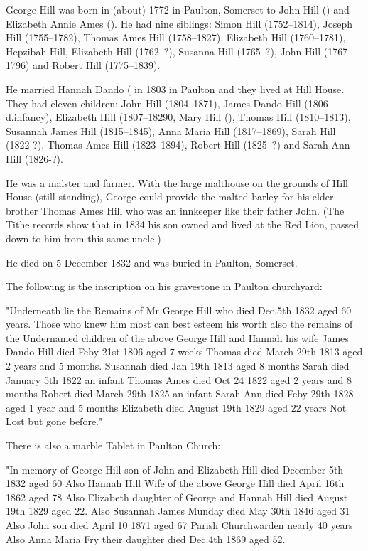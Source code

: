 
George Hill was born in (about) 1772 in	Paulton, Somerset to John Hill () and Elizabeth Annie Ames ().  He had nine siblings: Simon Hill (1752--1814), Joseph Hill (1755--1782), Thomas Ames Hill (1758--1827), Elizabeth Hill (1760--1781), Hepzibah Hill, Elizabeth Hill (1762--?), Susanna Hill (1765--?),
John Hill (1767--1796) and Robert Hill (1775--1839). 

He married Hannah Dando ( in 1803 in Paulton and they lived at Hill House. They had eleven children: 
John Hill (1804--1871), James Dando Hill (1806-d.infancy), Elizabeth Hill (1807--18290, Mary Hill (),
Thomas Hill (1810--1813), Susannah James Hill (1815--1845), Anna Maria Hill (1817--1869), Sarah Hill (1822-?),
Thomas Ames Hill (1823--1894), Robert Hill (1825--?) and Sarah Ann Hill (1826-?). 
    
He was a malster and farmer. With the large malthouse on the grounds of Hill House (still standing), George could provide the malted barley for his elder brother Thomas Ames Hill who was an innkeeper like their father John. (The Tithe records show that in 1834 his son owned and lived at the Red Lion, passed down to him from this same uncle.) 

He died on 5 December 1832 and was buried in Paulton, Somerset.

The following is the inscription on his gravestone in Paulton churchyard:

"Underneath lie the Remains of Mr George Hill who died Dec.5th 1832 aged 60 years.
Those who knew him most can best esteem his worth also the remains of the Undernamed children of the above
George Hill and Hannah his wife
James Dando Hill died Feby 21st 1806 aged 7 weeks
Thomas died March 29th 1813 aged 2 years and 5 months.
Susannah died Jan 19th 1813 aged 8 months
Sarah died January 5th 1822 an infant
Thomas Ames died Oct 24 1822 aged 2 years and 8 months
Robert died March 29th 1825 an infant
Sarah Ann died Feby 29th 1828 aged 1 year and 5 months
Elizabeth died August 19th 1829 aged 22 years
Not Lost but gone before."

There is also a marble Tablet in Paulton Church:

"In memory of George Hill son of John and Elizabeth Hill died December 5th 1832 aged 60
Also Hannah Hill Wife of the above George Hill died April 16th 1862 aged 78
Also Elizabeth daughter of George and Hannah Hill died August 19th 1829 aged 22.
Also Susannah James Munday died May 30th 1846 aged 31
Also John son died April 10 1871 aged 67 Parish Churchwarden nearly 40 years
Also Anna Maria Fry their daughter died Dec.4th 1869 aged 52.



